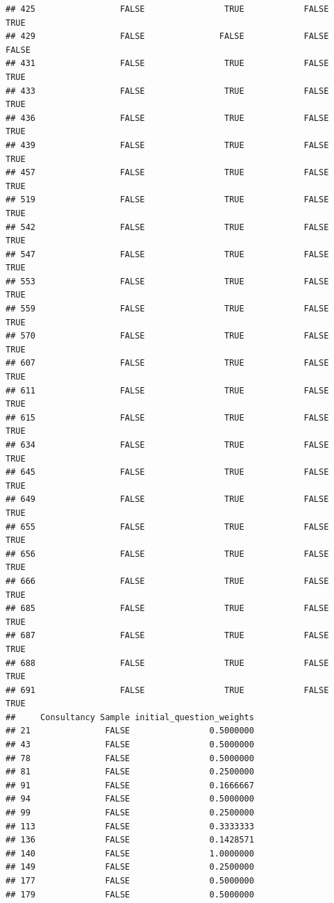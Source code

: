 \documentclass[
]{article}
\begin{document}
\begin{verbatim}
## 425                 FALSE                TRUE            FALSE   TRUE
## 429                 FALSE               FALSE            FALSE  FALSE
## 431                 FALSE                TRUE            FALSE   TRUE
## 433                 FALSE                TRUE            FALSE   TRUE
## 436                 FALSE                TRUE            FALSE   TRUE
## 439                 FALSE                TRUE            FALSE   TRUE
## 457                 FALSE                TRUE            FALSE   TRUE
## 519                 FALSE                TRUE            FALSE   TRUE
## 542                 FALSE                TRUE            FALSE   TRUE
## 547                 FALSE                TRUE            FALSE   TRUE
## 553                 FALSE                TRUE            FALSE   TRUE
## 559                 FALSE                TRUE            FALSE   TRUE
## 570                 FALSE                TRUE            FALSE   TRUE
## 607                 FALSE                TRUE            FALSE   TRUE
## 611                 FALSE                TRUE            FALSE   TRUE
## 615                 FALSE                TRUE            FALSE   TRUE
## 634                 FALSE                TRUE            FALSE   TRUE
## 645                 FALSE                TRUE            FALSE   TRUE
## 649                 FALSE                TRUE            FALSE   TRUE
## 655                 FALSE                TRUE            FALSE   TRUE
## 656                 FALSE                TRUE            FALSE   TRUE
## 666                 FALSE                TRUE            FALSE   TRUE
## 685                 FALSE                TRUE            FALSE   TRUE
## 687                 FALSE                TRUE            FALSE   TRUE
## 688                 FALSE                TRUE            FALSE   TRUE
## 691                 FALSE                TRUE            FALSE   TRUE
##     Consultancy Sample initial_question_weights
## 21               FALSE                0.5000000
## 43               FALSE                0.5000000
## 78               FALSE                0.5000000
## 81               FALSE                0.2500000
## 91               FALSE                0.1666667
## 94               FALSE                0.5000000
## 99               FALSE                0.2500000
## 113              FALSE                0.3333333
## 136              FALSE                0.1428571
## 140              FALSE                1.0000000
## 149              FALSE                0.2500000
## 177              FALSE                0.5000000
## 179              FALSE                0.5000000

\end{verbatim}
\end{document}
